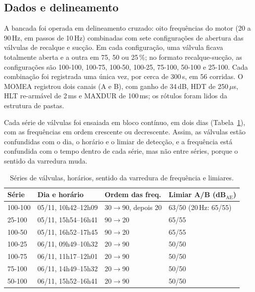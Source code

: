 \subsection{Dados e delineamento}
\label{mlp:sec:dados}

A bancada  foi operada em delineamento cruzado: oito frequências do motor (20 a 90\,Hz, em passos de 10\,Hz) combinadas com sete configurações de abertura das válvulas de recalque e sucção. Em cada configuração, uma válvula ficava totalmente aberta e a outra em 75, 50 ou 25\,\%; no formato recalque-sucção, as configurações são 100-100, 100-75, 100-50, 100-25, 75-100, 50-100 e 25-100. Cada combinação foi registrada uma única vez, por cerca de 300\,s, em 56 corridas. O MOMEA registrou dois canais (A e B), com ganho de 34\,dB, HDT de 250\,\(\mu\)s, HLT re-armável de 2\,ms e MAXDUR de 100\,ms; os rótulos foram lidos da estrutura de pastas.

Cada série de válvulas foi ensaiada em bloco contínuo, em dois dias (Tabela~\ref{mlp:tab:ordem}), com as frequências em ordem crescente ou decrescente. Assim, as válvulas estão confundidas com o dia, o horário e o limiar de detecção, e a frequência está confundida com o tempo dentro de cada série, mas não entre séries, porque o sentido da varredura muda.

\begin{table}[htbp]
	\centering
	\caption{Séries de válvulas, horários, sentido da varredura de frequência e limiares.}
	\label{mlp:tab:ordem}
	\small
	\begin{tabular}{llll}
		\toprule
		\textbf{Série} & \textbf{Dia e horário} & \textbf{Ordem das freq.} & \textbf{Limiar A/B (dB\(_{\mathrm{AE}}\))} \\
		\midrule
		100-100 & 05/11, 10h42--12h09 & 30\(\rightarrow\)90, depois 20 & 63/50 (20\,Hz: 65/55) \\
		25-100 & 05/11, 15h54--16h41 & 90\(\rightarrow\)20 & 65/55 \\
		100-50 & 05/11, 16h52--17h45 & 90\(\rightarrow\)20 & 65/55 \\
		100-25 & 06/11, 09h49--10h32 & 20\(\rightarrow\)90 & 50/50 \\
		100-75 & 06/11, 11h17--12h01 & 20\(\rightarrow\)90 & 50/50 \\
		75-100 & 06/11, 14h49--15h32 & 20\(\rightarrow\)90 & 50/50 \\
		50-100 & 06/11, 15h52--16h41 & 20\(\rightarrow\)90 & 50/50 \\
		\bottomrule
	\end{tabular}
\end{table}

